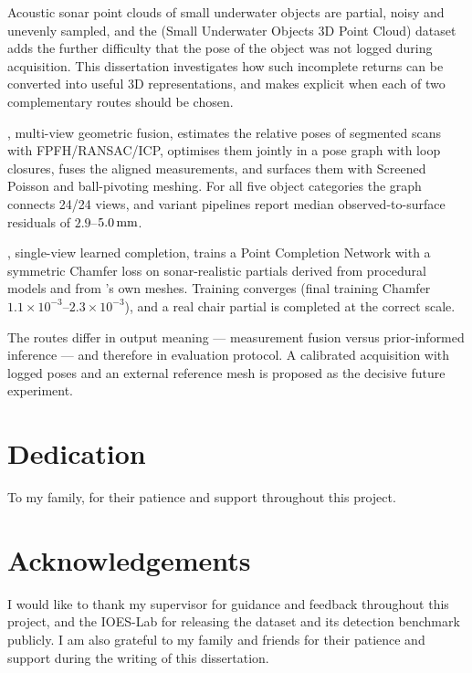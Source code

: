 Acoustic sonar point clouds of small underwater objects are partial, noisy and
unevenly sampled, and the \suop{} (Small Underwater Objects 3D Point Cloud)
dataset adds the further difficulty that the pose of the object was not logged
during acquisition. This dissertation investigates how such incomplete returns
can be converted into useful 3D representations, and makes explicit when each
of two complementary routes should be chosen.

\routeA{}, multi-view geometric fusion, estimates the relative poses of
segmented scans with FPFH/RANSAC/ICP, optimises them jointly in a pose graph
with loop closures, fuses the aligned measurements, and surfaces them with
Screened Poisson and ball-pivoting meshing. For all five object categories the
graph connects 24/24 views, and variant pipelines report median
observed-to-surface residuals of $2.9$--$5.0\,\text{mm}$.

\routeB{}, single-view learned completion, trains a Point Completion Network
with a symmetric Chamfer loss on sonar-realistic partials derived from
procedural models and from \routeA{}'s own meshes. Training converges (final
training Chamfer $1.1\times10^{-3}$--$2.3\times10^{-3}$), and a real chair
partial is completed at the correct scale.

The routes differ in output meaning --- measurement fusion versus
prior-informed inference --- and therefore in evaluation protocol. A
calibrated acquisition with logged poses and an external reference mesh is
proposed as the decisive future experiment.

\chapter*{Dedication}
To my family, for their patience and support throughout this project.

\chapter*{Acknowledgements}
I would like to thank my supervisor for guidance and feedback throughout this
project, and the IOES-Lab for releasing the \suop{} dataset and its detection
benchmark publicly. I am also grateful to my family and friends for their
patience and support during the writing of this dissertation.


